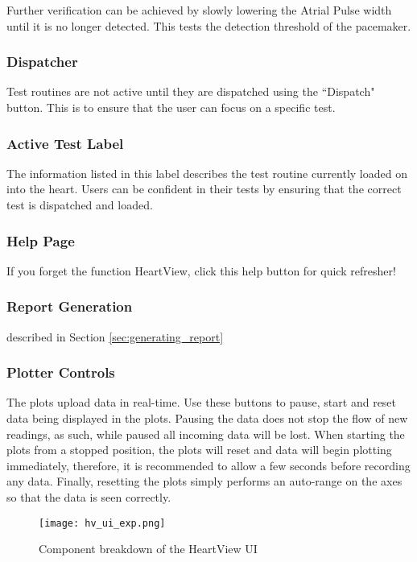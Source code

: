 \documentclass[11pt,fleqn]{book} %
\begin{document}
Further verification can be achieved by slowly lowering the Atrial Pulse width until it is no longer detected. This tests the detection threshold of the pacemaker.

\subsubsection*{Dispatcher} 
Test routines are not active until they are dispatched using the ``Dispatch" button. This is to ensure that the user can focus on a specific test. 

\subsubsection*{Active Test Label} 
The information listed in this label describes the test routine currently loaded on into the heart. Users can be confident in their tests by ensuring that the correct test is dispatched and loaded. 

\subsubsection*{Help Page} 
If you forget the function HeartView, click this help button for quick refresher! 

\subsubsection*{Report Generation} 
described in Section \ref{sec:generating_report} 

\subsubsection*{Plotter Controls}
The plots upload data in real-time. Use these buttons to pause, start and reset data being displayed in the plots. Pausing the data does not stop the flow of new readings, as such, while paused all incoming data will be lost. When starting the plots from a stopped position, the plots will reset and data will begin plotting immediately, therefore, it is recommended to allow a few seconds before recording any data. Finally, resetting the plots simply performs an auto-range on the axes so that the data is seen correctly. 

\begin{landscape}
\begin{figure}[h]
	\centering\texttt{[image: hv\_ui\_exp.png]}
	\caption{Component breakdown of the HeartView UI}
	\label{fig:ui_overview} %
\end{figure}
\end{landscape}
\end{document}
